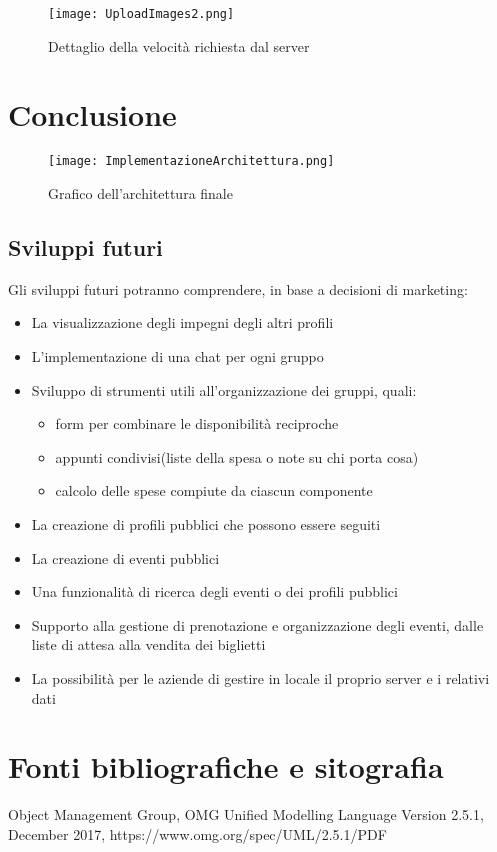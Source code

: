 \begin{figure}[htbp]
    \begin{center}
        \texttt{[image: UploadImages2.png]}
        \caption{Dettaglio della velocità richiesta dal server}
    \end{center}
\end{figure}


\clearpage
\chapter*{Conclusione}

\begin{figure}[htbp]
    \begin{center}
        \texttt{[image: ImplementazioneArchitettura.png]}
        \caption{Grafico dell'architettura finale}
    \end{center}
\end{figure}
\clearpage

\section{Sviluppi futuri}
Gli sviluppi futuri potranno comprendere, in base a decisioni di marketing:
\begin{itemize}
    \item La visualizzazione degli impegni degli altri profili
    \item L'implementazione di una chat per ogni gruppo
    \item Sviluppo di strumenti utili all'organizzazione dei gruppi, quali:
          \begin{itemize}
              \item form per combinare le disponibilità reciproche
              \item appunti condivisi(liste della spesa o note su chi porta cosa)
              \item calcolo delle spese compiute da ciascun componente
          \end{itemize}
    \item La creazione di profili pubblici che possono essere seguiti
    \item La creazione di eventi pubblici
    \item Una funzionalità di ricerca degli eventi o dei profili pubblici
    \item Supporto alla gestione di prenotazione e organizzazione degli eventi, dalle liste di attesa alla vendita dei biglietti
    \item La possibilità per le aziende di gestire in locale il proprio server e i relativi dati
\end{itemize}
\clearpage

\chapter*{Fonti bibliografiche e sitografia}

Object Management Group, OMG Unified Modelling Language Version 2.5.1, December 2017, https://www.omg.org/spec/UML/2.5.1/PDF
